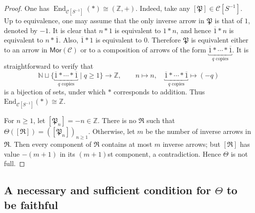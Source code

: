 \documentclass[10pt,a4paper]{amsart}
\theoremstyle{plain}
\theoremstyle{definition}
\theoremstyle{remark}
\begin{document}
\begin{proof}
  One has $\operatorname{End}_{\mathcal C[S^{-1}]}(\ast)\cong(\mathbb Z,+)$.
  Indeed, take any $[\mathfrak P] \in \mathcal{C}[S^{-1}]$.
  Up to equivalence, one may assume that the only inverse arrow in $\mathfrak P$ is that of $1$, denoted by $-1$.
  It is clear that $n \ast 1$ is equivalent to $1 \ast n$, and hence $\overline 1 \ast n$ is equivalent to $n \ast \overline 1$.
  Also, $\overline 1 \ast 1$ is equivalent to $0$.
  Therefore $\mathfrak P$ is equivalent either to an arrow in $\mathsf{Mor}(\mathcal C)$ or to a composition of arrows of the form $\underbracket{\overline 1\ast\cdots\ast\overline 1}_{q\text{ copies}}$.
  It is straightforward to verify that
  \[
    \mathbb N \sqcup \big\{\underbracket{\overline 1\ast\cdots\ast\overline 1}_{q\text{ copies}}\mid q \geq 1\big\} \longrightarrow \mathbb Z, \qquad n \longmapsto n, \quad \underbracket{\overline 1\ast\cdots\ast\overline 1}_{q\text{ copies}} \longmapsto (-q)
  \]
  is a bijection of sets, under which $\ast$ corresponds to addition.
  Thus $\mathrm{End}_{\mathcal{C}[S^{-1}]}(\ast) \cong \mathbb Z$.

  \medskip

  For $n\geq1$, let $[\mathfrak P_n]=-n\in\mathbb Z$.
  There is no $\mathfrak R$ such that $\Theta ([\mathfrak R])=([\mathfrak P_n])_{n \geq 1}$.
  Otherwise, let $m$ be the number of inverse arrows in $\mathfrak R$.
  Then every component of $\mathfrak R$ contains at most $m$ inverse arrows; but $[\mathfrak R]$ has value $-(m+1)$ in its $(m+1)$st component, a contradiction.
  Hence $\Theta$ is not full.
\end{proof}

\subsection{A necessary and sufficient condition for \texorpdfstring{$\Theta$}{Theta} to be faithful}
\end{document}
